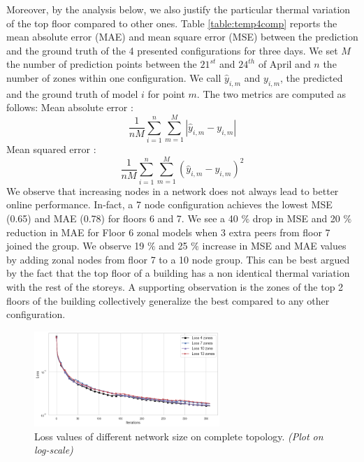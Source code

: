 %
Moreover, by the analysis below, we also justify the particular thermal variation of the top floor compared to other ones.
Table \ref{table:temp4comp} reports the mean absolute error (MAE) and mean square error (MSE) between the prediction and the ground truth of the 4 presented configurations for three days. We set $M$ the number of prediction points between the $21^{st}$ and $24^{th}$ of April and $n$ the number of zones within one configuration. We call $\hat{y}_{i,m}$ and $y_{i,m}$, the predicted and the ground truth of model $i$ for point $m$. The two metrics are computed as follows:
\newline
Mean absolute error : $$ \frac{1}{nM}\sum_{i=1}^n \sum_{m=1}^{M} |\hat{y}_{i,m} - y_{i,m}| $$
Mean squared error : $$ \frac{1}{nM}\sum_{i=1}^n \sum_{m=1}^{M} \left( \hat{y}_{i,m} - y_{i,m} \right)^2 $$
We observe that increasing nodes in a network does not always lead to better online performance.
In-fact, a 7 node configuration achieves the lowest MSE (0.65) and MAE (0.78) for floors 6 and 7.
We see a 40 $\%$ drop in MSE and 20 $\%$ reduction in MAE for Floor 6 zonal models when 3 extra peers from floor 7 joined the group.
We observe 19 $\%$ and 25 $\%$ increase in MSE and MAE values by adding zonal nodes from floor 7 to a 10 node group.
This can be best argued by the fact that the top floor of a building has a non identical thermal variation with the rest of the storeys. %
A supporting observation is the zones of the top 2 floors of the building collectively generalize the best compared to any other configuration.

\begin{figure}
    \centering
    \includegraphics[width=7cm]{./img/loss6.png}
    \caption{Loss values of different network size on complete topology. \textit{(Plot on log-scale)}}
    \label{fig:loss-multiple-size}
\end{figure}


